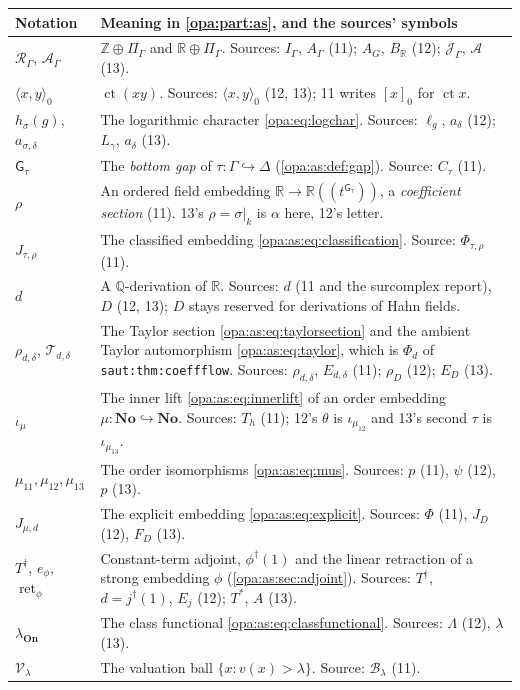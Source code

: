 \documentclass[11pt,oneside]{article}
\numberwithin{equation}{section}
\theoremstyle{definition}
\theoremstyle{remark}
\newcommand{\No}{\mathbf{No}}
\newcommand{\R}{\mathbb R}
\newcommand{\Q}{\mathbb Q}
\newcommand{\Z}{\mathbb Z}
\newcommand{\ct}{\operatorname{ct}}
\newcommand{\Hahn}[2]{#1((t^{#2}))}
\newcommand{\lbl}[1]{\nolinkurl{#1}}
\newcommand{\pairing}[2]{\langle #1,#2\rangle_0}
\newcommand{\gap}{\mathsf G}
\newcommand{\On}{\mathbf{On}}
\newcommand{\ret}{\operatorname{ret}}
\begin{document}
\begin{center}
\renewcommand{\arraystretch}{1.15}
\begin{longtable}{>{\raggedright\arraybackslash}p{}>{\raggedright\arraybackslash}p{}}
\toprule
Notation & Meaning in \cref{opa:part:as}, and the sources' symbols\\
\midrule
\endhead
$\mathcal R_\Gamma$, $\mathcal A_\Gamma$ & $\Z\oplus\Pi_\Gamma$ and $\R\oplus\Pi_\Gamma$.
Sources: $I_\Gamma$, $A_\Gamma$ (11); $A_G$, $B_\R$ (12); $\mathcal J_\Gamma$, $\mathcal A$
(13).\\
$\pairing xy$ & $\ct(xy)$. Sources: $\langle x,y\rangle_0$ (12, 13); 11 writes $[x]_0$ for
$\ct x$.\\
$h_\sigma(g)$, $a_{\sigma,\delta}$ & The logarithmic character \eqref{opa:eq:logchar}.
Sources: $\ell_g$, $a_\delta$ (12); $L_\gamma$, $a_\delta$ (13).\\
$\gap_\tau$ & The \emph{bottom gap} of $\tau:\Gamma\hookrightarrow\Delta$
(\cref{opa:as:def:gap}). Source: $C_\tau$ (11).\\
$\rho$ & An ordered field embedding $\R\to\Hahn\R{\gap_\tau}$, a \emph{coefficient
section} (11). 13's $\rho=\sigma|_k$ is $\alpha$ here, 12's letter.\\
$J_{\tau,\rho}$ & The classified embedding \eqref{opa:as:eq:classification}. Source:
$\Phi_{\tau,\rho}$ (11).\\
$d$ & A $\Q$-derivation of $\R$. Sources: $d$ (11 and the surcomplex report), $D$ (12,
13); $D$ stays reserved for derivations of Hahn fields.\\
$\rho_{d,\delta}$, $\mathcal T_{d,\delta}$ & The Taylor section
\eqref{opa:as:eq:taylorsection} and the ambient Taylor automorphism
\eqref{opa:as:eq:taylor}, which is $\Phi_d$ of \lbl{saut:thm:coeffflow}. Sources:
$\rho_{d,\delta}$, $E_{d,\delta}$ (11); $\rho_D$ (12); $E_D$ (13).\\
$\iota_\mu$ & The inner lift \eqref{opa:as:eq:innerlift} of an order embedding
$\mu:\No\hookrightarrow\No$. Sources: $T_h$ (11); 12's $\theta$ is
$\iota_{\mu_{12}}$ and 13's second $\tau$ is $\iota_{\mu_{13}}$.\\
$\mu_{11},\mu_{12},\mu_{13}$ & The order isomorphisms \eqref{opa:as:eq:mus}. Sources:
$p$ (11), $\psi$ (12), $p$ (13).\\
$J_{\mu,d}$ & The explicit embedding \eqref{opa:as:eq:explicit}. Sources: $\Phi$ (11),
$J_D$ (12), $F_D$ (13).\\
$T^\dagger$, $e_\phi$, $\ret_\phi$ & Constant-term adjoint, $\phi^\dagger(1)$ and the
linear retraction of a strong embedding $\phi$ (\cref{opa:as:sec:adjoint}). Sources:
$T^\dagger$, $d=j^\dagger(1)$, $E_j$ (12); $T^*$, $A$ (13).\\
$\lambda_{\On}$ & The class functional \eqref{opa:as:eq:classfunctional}. Sources:
$\Lambda$ (12), $\lambda$ (13).\\
$\mathcal V_\lambda$ & The valuation ball $\{x:v(x)>\lambda\}$. Source:
$\mathcal B_\lambda$ (11).\\
\bottomrule
\end{longtable}
\end{center}
\end{document}
